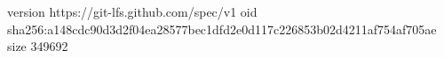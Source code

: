 version https://git-lfs.github.com/spec/v1
oid sha256:a148cdc90d3d2f04ea28577bec1dfd2e0d117c226853b02d4211af754af705ae
size 349692
